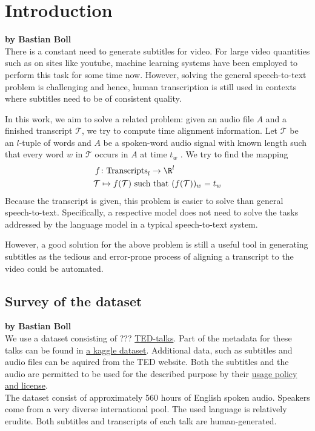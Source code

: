 \chapter{Introduction}
\label{chap:intro}

\textbf{by Bastian Boll} \\

There is a constant need to generate subtitles for video. For large video quantities such as on sites like youtube, machine learning systems have been employed to perform this task for some time now. However, solving the general speech-to-text problem is challenging and hence, human transcription is still used in contexts where subtitles need to be of consistent quality.

In this work, we aim to solve a related problem: given an audio file $A$ and a finished transcript $\mathcal{T}$, we try to compute time alignment information. Let $\mathcal{T}$ be an $l$-tuple of words and $A$ be a spoken-word audio signal with known length such that every word $w$ in $\mathcal{T}$ occurs in $A$ at time $t_w$ . We try to find the mapping
\begin{align*}
	f&\colon\textrm{Transcripts}_l\to\R^l\\
	\mathcal{T}&\mapsto f(\mathcal{T})\textrm{ such that }(f(\mathcal{T}))_w=t_w
\end{align*}
Because the transcript is given, this problem is easier to solve than general speech-to-text. Specifically, a respective model does not need to solve the tasks addressed by the language model in a typical speech-to-text system.

However, a good solution for the above problem is still a useful tool in generating subtitles as the tedious and error-prone process of aligning a transcript to the video could be automated.

\section{Survey of the dataset}

\textbf{by Bastian Boll} \\

We use a dataset consisting of ??? \href{https://www.ted.com}{TED-talks}. Part of the metadata for these talks can be found in \href{https://www.kaggle.com/rounakbanik/ted-talks}{a kaggle dataset}. Additional data, such as subtitles and audio files can be aquired from the TED website. Both the subtitles and the audio are permitted to be used for the described purpose by their \href{https://www.ted.com/about/our-organization/our-policies-terms/ted-talks-usage-policy}{usage policy and license}.\\
The dataset consist of approximately 560 hours of English spoken audio. Speakers come from a very diverse international pool. The used language is relatively erudite. Both subtitles and transcripts of each talk are human-generated.